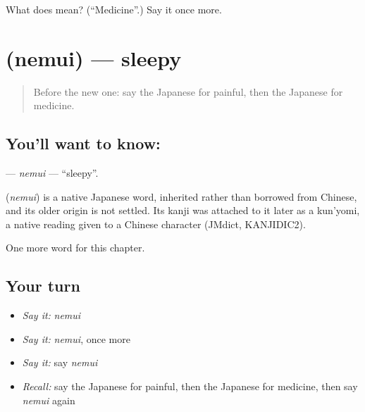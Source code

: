 \begin{tcolorbox}[breakable,colback=teal!4,colframe=teal!35!black,title={Before you move on}]
What does  mean? (\textquotedblleft{}Medicine\textquotedblright{}.) Say it once more.
\end{tcolorbox}
\section[\texorpdfstring{\ja{ねむい} (nemui)}{ねむい (nemui)}]{ (nemui) — sleepy}

\label{lesson:JA-C23-nemui}



\begin{quote}
Before the new one: say the Japanese for painful, then the Japanese for medicine.
\end{quote}

\subsection*{You'll want to know: }
\textbf{} — \emph{nemui} — \textquotedblleft{}sleepy\textquotedblright{}.

\begin{cousinweb}
\textbf{} (\emph{nemui}) is a native Japanese word, inherited rather than borrowed from Chinese, and its older origin is not settled. Its kanji was attached to it later as a kun'yomi, a native reading given to a Chinese character (JMdict, KANJIDIC2).
\end{cousinweb}

\begin{grammarlens}[title={What you've built}]
One more word for this chapter.
\end{grammarlens}

\subsection*{Your turn}
\begin{itemize}
\raggedright
  \item \emph{Say it:} \emph{nemui}
  \item \emph{Say it:} \emph{nemui}, once more
  \item \emph{Say it:} say \emph{nemui}
  \item \emph{Recall:} say the Japanese for painful, then the Japanese for medicine, then say \emph{nemui} again
\end{itemize}

